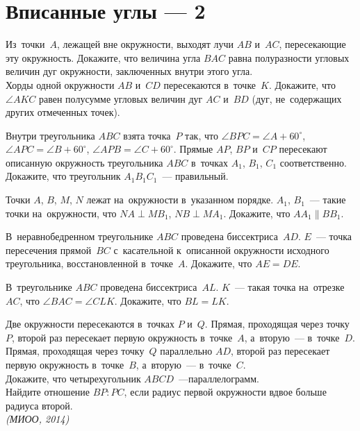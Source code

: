 
\section*{Вписанные углы --- 2}


\begin{problems}

\item
\subproblem
Из~точки~$A$, лежащей вне окружности, выходят лучи $AB$ и~$AC$, пересекающие
эту окружность.
Докажите, что величина угла $BAC$ равна полуразности угловых величин дуг
окружности, заключенных внутри этого угла.
\\
\subproblem
Хорды одной окружности $AB$ и~$CD$ пересекаются в~точке~$K$.
Докажите, что $\angle AKC$ равен полусумме угловых величин дуг $AC$ и~$BD$
(дуг, не~содержащих других отмеченных точек).

\item
Внутри треугольника $ABC$ взята точка~$P$ так, что
$\angle BPC = \angle A + 60^{\circ}$,
$\angle APC = \angle B + 60^{\circ}$,
$\angle APB = \angle C + 60^{\circ}$.
Прямые $AP$, $BP$ и~$CP$ пересекают описанную окружность треугольника $ABC$
в~точках $A_1$, $B_1$, $C_1$ соответственно.
Докажите, что треугольник $A_1 B_1 C_1$~--- правильный.

\item
Точки $A$, $B$, $M$, $N$ лежат на~окружности в~указанном порядке.
$A_1$, $B_1$~--- такие точки на~окружности, что
$NA \perp M B_1$, $NB \perp M A_1$.
Докажите, что $A A_1 \parallel B B_1$.

\item
В~неравнобедренном треугольнике $ABC$ проведена биссектриса~$AD$.
$E$~--- точка пересечения прямой~$BC$ с~касательной к~описанной окружности
исходного треугольника, восстановленной в~точке~$A$.
Докажите, что $AE = DE$.

\item
В~треугольнике $ABC$ проведена биссектриса~$AL$.
$K$~--- такая точка на~отрезке~$AC$, что $\angle BAC = \angle CLK$.
Докажите, что $BL = LK$.

\item
Две окружности пересекаются в~точках $P$ и~$Q$.
Прямая, проходящая через точку~$P$, второй раз пересекает первую окружность
в~точке~$A$, а~вторую~--- в~точке~$D$.
Прямая, проходящая через точку~$Q$ параллельно $AD$, второй раз пересекает
первую окружность в~точке~$B$, а~вторую~--- в~точке~$C$.
\\
\subproblem
Докажите, что четырехугольник $ABCD$~---параллелограмм.
\\
\subproblem
Найдите отношение $BP : PC$, если радиус первой окружности вдвое больше радиуса
второй.
\\
\emph{(МИОО, 2014)}


\end{problems}
